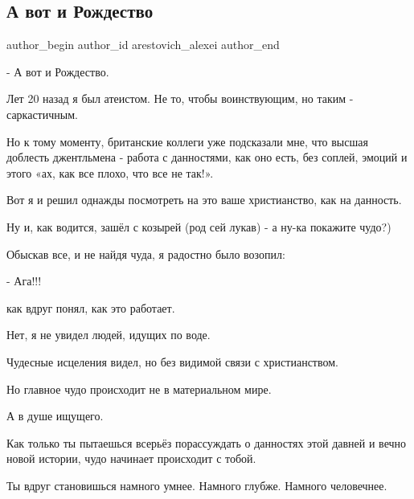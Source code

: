  
 
 
 
 
 
\subsection{А вот и Рождество}
\label{sec:24_12_2021.fb.arestovich_alexei.1.a_vot_i_rozhdestvo}
 
\ifcmt
 author_begin
   author_id arestovich_alexei
 author_end
\fi

- А вот и Рождество. 

Лет 20 назад я был атеистом. Не то, чтобы воинствующим, но таким -
саркастичным. 


Но к тому моменту, британские коллеги уже подсказали мне, что высшая доблесть
джентльмена - работа с данностями, как оно есть, без соплей, эмоций и этого
«ах, как все плохо, что все не так!».

Вот я и решил однажды посмотреть на это ваше христианство, как на данность.

Ну и, как водится, зашёл с козырей (род сей лукав) - а ну-ка покажите чудо?)

Обыскав все, и не найдя чуда, я радостно было возопил:

- Ага!!!

как вдруг понял, как это работает. 

Нет, я не увидел людей, идущих по воде.

Чудесные исцеления видел, но без видимой связи с христианством. 

Но главное чудо происходит не в материальном мире.

А в душе ищущего. 

Как только ты пытаешься всерьёз порассуждать о данностях этой давней и вечно
новой истории, чудо начинает происходит с тобой.

Ты вдруг становишься намного умнее. Намного глубже. Намного человечнее. 

